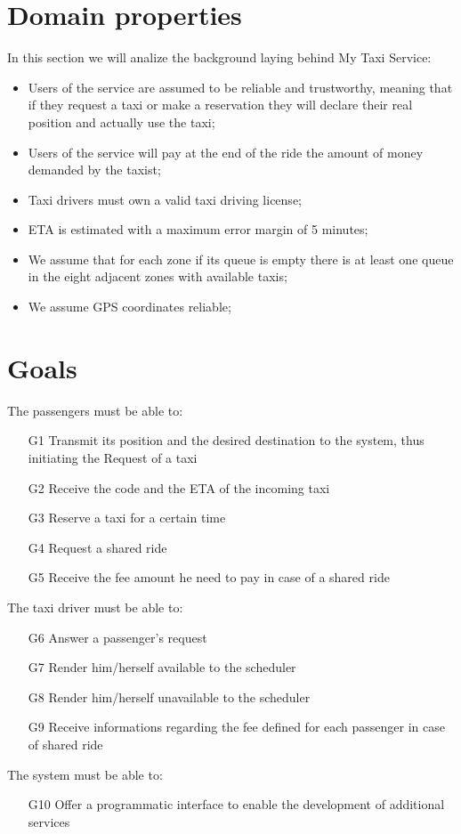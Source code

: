 \documentclass[a4paper,11pt]{report}
\begin{document}
\section{Domain properties}
In this section we will analize the background laying behind My Taxi Service:
\begin{itemize}
\item Users of the service are assumed to be reliable and trustworthy, meaning that if they request a taxi or make a reservation
they will declare their real position and actually use the taxi;\\
\item Users of the service will pay at the end of the ride the amount of money demanded by the taxist;\\
\item Taxi drivers must own a valid taxi driving license;\\
\item ETA is estimated with a maximum error margin of 5 minutes;\\
\item We assume that for each zone if its queue is empty there is at least one queue in the eight adjacent zones with available taxis;\\
\item We assume GPS coordinates reliable;\\
\end{itemize}
\section{Goals}
The passengers must be able to:
\begin{itemize}
  \item [G1] Transmit its position and the desired destination to the system, thus initiating the Request of a taxi
  \item [G2] Receive the code and the ETA of the incoming taxi
  \item [G3] Reserve a taxi for a certain time  %
  \item [G4] Request a shared ride
  \item [G5] Receive the fee amount he need to pay in case of a shared ride
\end{itemize}
The taxi driver must be able to:
\begin{itemize}
  \item [G6] Answer a passenger's request
  \item [G7] Render him/herself available to the scheduler
  \item [G8] Render him/herself unavailable to the scheduler
  \item [G9] Receive informations regarding the fee defined for each passenger in case of shared ride
\end{itemize}
The system must be able to:
\begin{itemize}
  \item [G10] Offer a programmatic interface to enable the development of additional services
\end{itemize}
\end{document}
